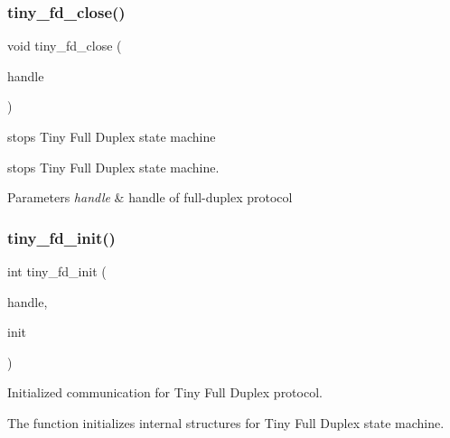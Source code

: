 \subsubsection{\texorpdfstring{tiny\+\_\+fd\+\_\+close()}{tiny\_fd\_close()}}
{\footnotesize\ttfamily void tiny\+\_\+fd\+\_\+close (\begin{DoxyParamCaption}\item[{\hyperlink{tiny__fd_8h_a91e6b79431fe38570fb102701ef0b7e8}{tiny\+\_\+fd\+\_\+handle\+\_\+t}}]{handle }\end{DoxyParamCaption})}



stops Tiny Full Duplex state machine 

stops Tiny Full Duplex state machine.


\begin{DoxyParams}{Parameters}
{\em handle} & handle of full-\/duplex protocol \\
\hline
\end{DoxyParams}
\mbox{\label{group__FULL__DUPLEX__API_ga73c3e76cfbcd7b9bb8e1f7826175774b}} 
\subsubsection{\texorpdfstring{tiny\+\_\+fd\+\_\+init()}{tiny\_fd\_init()}}
{\footnotesize\ttfamily int tiny\+\_\+fd\+\_\+init (\begin{DoxyParamCaption}\item[{\hyperlink{tiny__fd_8h_a91e6b79431fe38570fb102701ef0b7e8}{tiny\+\_\+fd\+\_\+handle\+\_\+t} $\ast$}]{handle,  }\item[{\hyperlink{tiny__fd_8h_ac931714d7bbe299856f4533fd1edb7f6}{S\+Tiny\+Fd\+Init} $\ast$}]{init }\end{DoxyParamCaption})}



Initialized communication for Tiny Full Duplex protocol. 

The function initializes internal structures for Tiny Full Duplex state machine.


